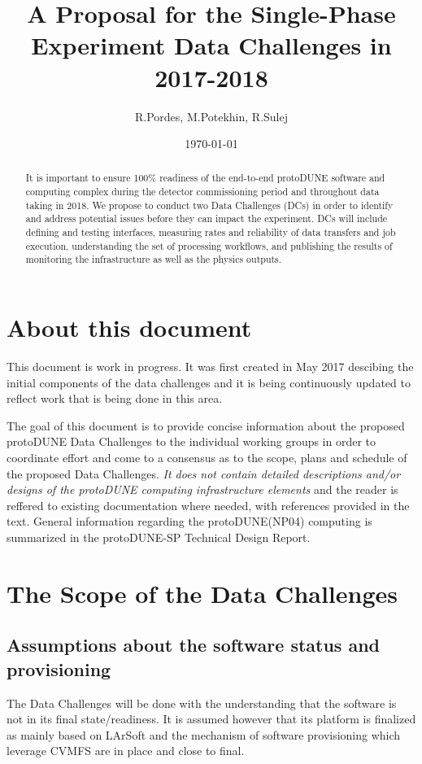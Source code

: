\documentclass[pdftex,12pt,letter]{article}
\title{A Proposal for the Single-Phase \pd Experiment Data Challenges in 2017-2018}
\date{\today}
\author{R.Pordes, M.Potekhin, R.Sulej}
\newcommand{\pd}{protoDUNE\xspace}
\begin{document}
\maketitle

\begin{abstract}



\noindent It is important to ensure 100\% readiness of the
end-to-end \pd software and computing complex during the detector commissioning period and
throughout data taking in 2018. We propose to conduct two Data Challenges (DCs) in order to identify
and address potential issues before they can impact the experiment.
DCs will include defining and  testing interfaces, measuring rates and reliability of data transfers
and job execution, understanding the set of processing workflows, and publishing the results of monitoring
the infrastructure as well as the physics outputs.


\end{abstract}

\tableofcontents

\pagebreak

\section{About this document}
This document is work in progress. It was first created in May 2017 descibing the initial components
of the data challenges and it is being continuously updated to reflect work that is being done in this area.


The goal of this document is to provide concise information about the proposed \pd Data Challenges
to the individual working groups in order to coordinate effort and come to a consensus as to the scope,
plans and schedule of the proposed Data Challenges. \textit{It does not contain detailed descriptions
and/or designs of the \pd computing
infrastructure elements} and the reader is reffered to existing documentation where
needed, with references provided in the text.
General information regarding the \pd (NP04) computing is summarized in the \pd-SP Technical Design Report\cite{docdb1794}.

\section{The Scope of the Data Challenges}
\subsection{Assumptions about the software status and provisioning}
The Data Challenges will be done with the understanding that the software is not in its final state/readiness. It is assumed
however that its platform is finalized as mainly based on LArSoft and the mechanism of software provisioning which leverage
CVMFS are in place and close to final.
\end{document}
